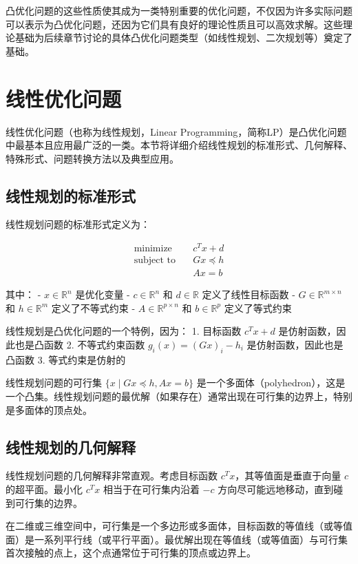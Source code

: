 \documentclass[12pt,a4paper]{book}
\begin{document}
凸优化问题的这些性质使其成为一类特别重要的优化问题，不仅因为许多实际问题可以表示为凸优化问题，还因为它们具有良好的理论性质且可以高效求解。这些理论基础为后续章节讨论的具体凸优化问题类型（如线性规划、二次规划等）奠定了基础。

\section{线性优化问题}

线性优化问题（也称为线性规划，Linear Programming，简称LP）是凸优化问题中最基本且应用最广泛的一类。本节将详细介绍线性规划的标准形式、几何解释、特殊形式、问题转换方法以及典型应用。

\subsection{线性规划的标准形式}

线性规划问题的标准形式定义为：

$$
\begin{aligned}
\text{minimize} \quad & c^T x + d \\
\text{subject to} \quad & Gx \preceq h \\
& Ax = b
\end{aligned}
$$

其中：
- $x \in \mathbb{R}^n$ 是优化变量
- $c \in \mathbb{R}^n$ 和 $d \in \mathbb{R}$ 定义了线性目标函数
- $G \in \mathbb{R}^{m \times n}$ 和 $h \in \mathbb{R}^m$ 定义了不等式约束
- $A \in \mathbb{R}^{p \times n}$ 和 $b \in \mathbb{R}^p$ 定义了等式约束

线性规划是凸优化问题的一个特例，因为：
1. 目标函数 $c^T x + d$ 是仿射函数，因此也是凸函数
2. 不等式约束函数 $g_i(x) = (Gx)_i - h_i$ 是仿射函数，因此也是凸函数
3. 等式约束是仿射的

线性规划问题的可行集 $\{x \mid Gx \preceq h, Ax = b\}$ 是一个多面体（polyhedron），这是一个凸集。线性规划问题的最优解（如果存在）通常出现在可行集的边界上，特别是多面体的顶点处。

\subsection{线性规划的几何解释}

线性规划问题的几何解释非常直观。考虑目标函数 $c^T x$，其等值面是垂直于向量 $c$ 的超平面。最小化 $c^T x$ 相当于在可行集内沿着 $-c$ 方向尽可能远地移动，直到碰到可行集的边界。

在二维或三维空间中，可行集是一个多边形或多面体，目标函数的等值线（或等值面）是一系列平行线（或平行平面）。最优解出现在等值线（或等值面）与可行集首次接触的点上，这个点通常位于可行集的顶点或边界上。
\end{document}
